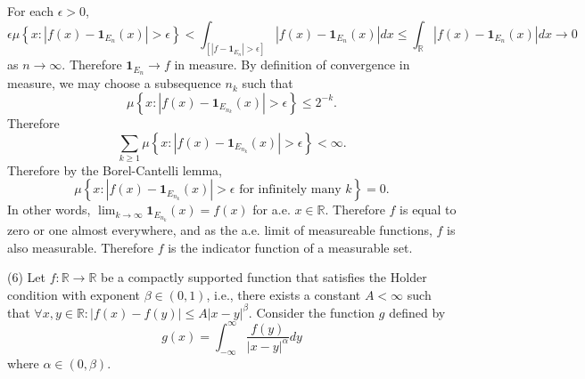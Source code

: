\documentclass{exam}
\theoremstyle{problemstyle}
\newcommand{\1}[1]{\textbf{1}_{\left[#1\right]}} %
\def\R{\mathbb{R}} %
\begin{document}
\begin{questions}
\begin{solution}
For each $\epsilon>0$, 
\begin{equation*}
  \epsilon \mu \left\{ x: |f(x)-\mathbf{1}_{E_{n}}(x)| >\epsilon \right\}
  <  \int_{\left[|f-\mathbf{1}_{E_{n}}| >\epsilon \right]} |f(x)-\mathbf{1}_{E_{n}}(x)|dx
  \leq \int_{\R} |f(x)-\mathbf{1}_{E_{n}}(x)|dx \to 0
\end{equation*}
as $n\to \infty$.
Therefore $\mathbf{1}_{E_{n}}\to f$ in measure. By definition of convergence in measure, we may choose a subsequence $n_{k}$ such that
\begin{equation*}
  \mu \left\{ x: |f(x)-\mathbf{1}_{E_{n_{k}}}(x)|>\epsilon \right\} \leq 2^{-k}.
\end{equation*}
Therefore
\begin{equation*}
  \sum_{k\geq 1}\mu \left\{ x: |f(x)-\mathbf{1}_{E_{n_{k}}}(x)|>\epsilon \right\}<\infty.
\end{equation*}
Therefore by the Borel-Cantelli lemma,
\begin{equation*}
  \mu \left\{ x: |f(x)-\mathbf{1}_{E_{n_{k}}}(x)|>\epsilon \text{ for infinitely many }k \right\}=0.
\end{equation*}
In other words, $\lim_{k\to \infty} \mathbf{1}_{E_{n_{k}}}(x) = f(x)$ for a.e. $x\in \R$. Therefore $f$ is equal to zero or one almost everywhere, and as the a.e. limit of measureable functions, $f$ is also measurable. Therefore $f$ is the indicator function of a measurable set.

\end{solution}




\question (6) Let $f: \R\to\R$ be a compactly supported function that satisfies the Holder condition with exponent $\beta\in (0,1)$, i.e., there exists a constant $A<\infty$ such that $\forall x,y\in \R: |f(x)-f(y)|\leq A|x-y|^{\beta}$. Consider the function $g$ defined by
\begin{equation*}
g(x) = \int_{-\infty}^{\infty} \frac{f(y)}{|x-y|^{\alpha}} dy
\end{equation*}
where $\alpha \in (0,\beta).$
\begin{parts}

\end{parts}
\end{questions}
\end{document}
